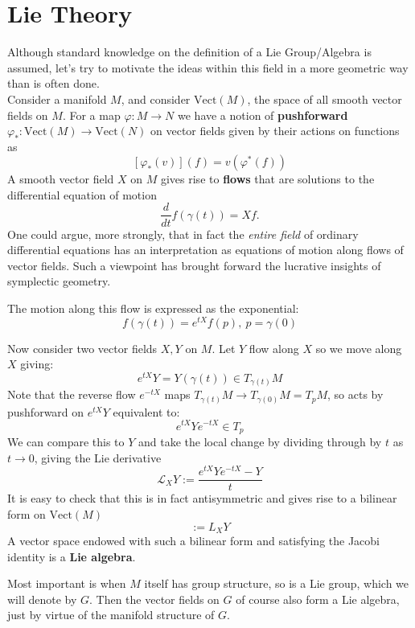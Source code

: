 		\section{Lie Theory}
		
		Although standard knowledge on the definition of a Lie Group/Algebra is assumed, let's try to motivate the ideas within this field in a more geometric way than is often done. \\
		
		Consider a manifold $M$, and consider $\text{Vect}(M)$, the space of all smooth vector fields on $M$. For a map $\varphi: M \rightarrow N$ we have a notion of \textbf{pushforward} $\varphi_*: \text{Vect}(M) \rightarrow \text{Vect}(N)$ on vector fields given by their actions on functions as
		\[
			[\varphi_* (v)] (f) = v (\varphi^* (f))
		\]
		A smooth vector field $X$ on $M$ gives rise to \textbf{flows} that are solutions to the differential equation of motion
		\[
			\frac{d}{dt} f(\gamma(t)) = X f.
		\]
		One could argue, more strongly, that in fact the \emph{entire field} of ordinary differential equations has an interpretation as equations of motion along flows of vector fields. Such a viewpoint has brought forward the lucrative insights of symplectic geometry. 
		
		The motion along this flow is expressed as the exponential:
		\[
			f(\gamma(t)) = e^{t X} f(p), ~ p = \gamma(0)
		\]
		
		Now consider two vector fields $X,Y$ on $M$. Let $Y$ flow along $X$ so we move along $X$ giving:
		\[
			e^{tX} Y = Y(\gamma(t)) \in T_{\gamma(t)}M
		\]
		Note that the reverse flow $e^{-t X}$ maps $T_{\gamma(t)} M \to T_{\gamma(0)}M = T_pM$, so acts by pushforward on $e^{tX} Y$ equivalent to:
		\[
			e^{tX} Y e^{-tX} \in T_p
		\]
		We can compare this to $Y$ and take the local change by dividing through by $t$ as $t \to 0$, giving the Lie derivative
		\begin{equation}
			\mathcal L_X Y := \frac{e^{tX} Y e^{-tX} - Y}{t}
		\end{equation}
		It is easy to check that this is in fact antisymmetric and gives rise to a bilinear form on $\mathrm{Vect}(M)$
		\begin{equation}
			[X,Y]:= L_X Y
		\end{equation}
		A vector space endowed with such a bilinear form and satisfying the Jacobi identity is a \textbf{Lie algebra}.
		
		Most important is when $M$ itself has group structure, so is a Lie group, which we will denote by $G$. Then the vector fields on $G$ of course also form a Lie algebra, just by virtue of the manifold structure of $G$. 
		
